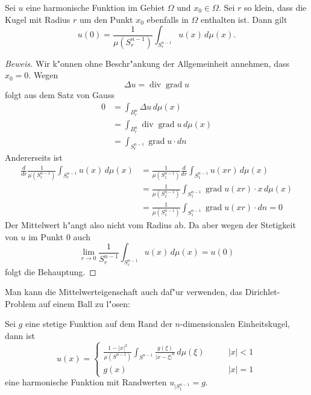 \begin{satz}[Mittelwerteigenschaft]
Sei $u$ eine harmonische Funktion im Gebiet $\Omega$ und $x_0\in\Omega$.
Sei $r$ so klein, dass die Kugel mit Radius $r$ um den Punkt $x_0$
ebenfalls in $\Omega$ enthalten ist. Dann gilt
\[
u(0)=\frac1{\mu(S^{n-1}_r)}\int_{S^{n-1}_r}u(x)\,d\mu(x).
\]
\end{satz}
\begin{proof}[Beweis]
Wir k"onnen ohne Beschr"ankung der Allgemeinheit annehmen, dass $x_0=0$.
Wegen 
\[
\Delta u=\operatorname{div}\operatorname{grad}u
\]
folgt aus dem Satz von Gauss
\begin{align*}
0&=\int_{B_r^n}\Delta u\,d\mu(x)
\\
&=\int_{B_r^n}\operatorname{div}\operatorname{grad}u\,d\mu(x)
\\
&=\int_{S_r^{n-1}} \operatorname{grad}u\cdot dn
\end{align*}
Andererseits ist 
\begin{align*}
\frac{d}{dr}\frac{1}{\mu(S_r^{n-1})}\int_{S_r^{n-1}} u(x)\,d\mu(x)
&=
\frac1{\mu(S_1^{n-1})}\frac{d}{dr}\int_{S_1^{n-1}}u(xr)\,d\mu(x)
\\
&=
\frac1{\mu(S_1^{n-1})}\int_{S_1^{n-1}}\operatorname{grad}u(xr)\cdot x
\,d\mu(x)
\\
&=
\frac1{\mu(S_1^{n-1})}\int_{S_1^{n-1}}\operatorname{grad}u(xr)\cdot dn=0
\end{align*}
Der Mittelwert h"angt also nicht vom Radius ab. Da aber wegen
der Stetigkeit von $u$ im Punkt $0$ auch
\[
\lim_{r\to 0}\frac1{S_r^{n-1}}\int_{S_r^{n-1}}u(x)\,d\mu(x)=u(0)
\]
folgt die Behauptung.
\end{proof}

Man kann die Mittelwerteigenschaft auch daf"ur verwenden, das Dirichlet-Problem
auf einem Ball zu l"osen:

\begin{satz}
Sei $g$ eine stetige Funktion auf dem Rand der $n$-dimensio\-nalen
Einheitskugel, dann ist
\[
u(x)=\begin{cases}
\displaystyle \frac{1-|x|^2}{\mu(S^{n-1})}
\int_{S^{n-1}}\frac{g(\xi)}{|x-\xi|^n}\,d\mu(\xi)&\qquad |x|<1\\
g(x)&\qquad |x|=1
\end{cases}
\]
eine harmonische Funktion mit Randwerten $u_{|S_1^{n-1}}=g$.
\end{satz}

